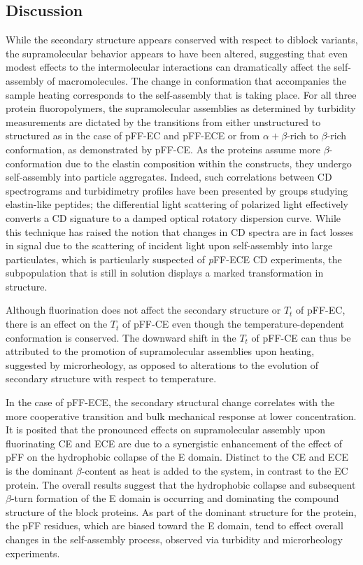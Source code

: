 \begin{refsection}
\section{Discussion}

While the secondary structure appears conserved with respect to diblock
variants, the supramolecular behavior appears to have been altered, suggesting
that even modest effects to the intermolecular interactions can dramatically
affect the self-assembly of macromolecules.\cite{URRY1974} The change in
conformation that accompanies the sample heating corresponds to the
self-assembly that is taking place. For all three protein fluoropolymers, the
supramolecular assemblies as determined by turbidity measurements are dictated
by the transitions from either unstructured to structured as in the case of
pFF-EC and pFF-ECE or from ${\alpha+\beta}$-rich to ${\beta}$-rich conformation,
as demonstrated by pFF-CE. As the proteins assume more ${\beta}$- conformation
due to the elastin composition within the constructs, they undergo self-assembly
into particle aggregates. Indeed, such correlations between CD spectrograms and
turbidimetry profiles have been presented by groups studying elastin-like
peptides; the differential light scattering of polarized light effectively
converts a CD signature to a damped optical rotatory dispersion curve. While
this technique has raised the notion that changes in CD spectra are in fact
losses in signal due to the scattering of incident light upon self-assembly into
large particulates, which is particularly suspected of \emph{p}FF-ECE CD
experiments, the subpopulation that is still in solution displays a marked
transformation in structure.

Although fluorination does not affect the secondary structure or ${T_t}$ of
pFF-EC, there is an effect on the ${T_t}$ of pFF-CE even though the
temperature-dependent conformation is conserved. The downward shift in the
${T_t}$ of pFF-CE can thus be attributed to the promotion of supramolecular
assemblies upon heating, suggested by microrheology, as opposed to alterations
to the evolution of secondary structure with respect to temperature.

In the case of pFF-ECE, the secondary structural change correlates with the more
cooperative transition and bulk mechanical response at lower concentration. It
is posited that the pronounced effects on supramolecular assembly upon
fluorinating CE and ECE are due to a synergistic enhancement of the effect of
pFF on the hydrophobic collapse of the E domain. Distinct to the CE and ECE is
the dominant ${\beta}$-content as heat is added to the system, in contrast to
the EC protein. The overall results suggest that the hydrophobic collapse and
subsequent ${\beta}$-turn formation of the E domain is occurring and dominating
the compound structure of the block proteins. As part of the dominant structure
for the protein, the pFF residues, which are biased toward the E domain, tend to
effect overall changes in the self-assembly process, observed via turbidity and
microrheology experiments.


\end{refsection}
